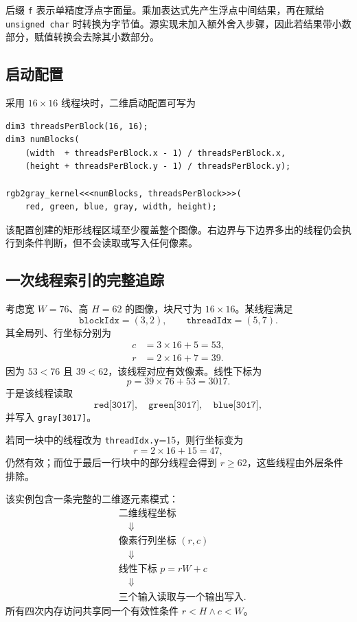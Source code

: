 后缀 \texttt{f} 表示单精度浮点字面量。乘加表达式先产生浮点中间结果，再在赋给 \texttt{unsigned char} 时转换为字节值。源实现未加入额外舍入步骤，因此若结果带小数部分，赋值转换会去除其小数部分。

\subsection{启动配置}

采用 $16\times16$ 线程块时，二维启动配置可写为
\par\noindent\begin{minipage}{\linewidth}
\begin{lstlisting}[caption={RGB 转灰度核函数的二维启动配置}]
dim3 threadsPerBlock(16, 16);
dim3 numBlocks(
    (width  + threadsPerBlock.x - 1) / threadsPerBlock.x,
    (height + threadsPerBlock.y - 1) / threadsPerBlock.y);

rgb2gray_kernel<<<numBlocks, threadsPerBlock>>>(
    red, green, blue, gray, width, height);
\end{lstlisting}
\end{minipage}\par

该配置创建的矩形线程区域至少覆盖整个图像。右边界与下边界多出的线程仍会执行到条件判断，但不会读取或写入任何像素。

\subsection{一次线程索引的完整追踪}

考虑宽 $W=76$、高 $H=62$ 的图像，块尺寸为 $16\times16$。某线程满足
\[
\texttt{blockIdx}=(3,2),
\qquad
\texttt{threadIdx}=(5,7).
\]
其全局列、行坐标分别为
\[
\begin{aligned}
c&=3\times16+5=53,\\
r&=2\times16+7=39.
\end{aligned}
\]
因为 $53<76$ 且 $39<62$，该线程对应有效像素。线性下标为
\[
p=39\times76+53=3017.
\]
于是该线程读取
\[
\texttt{red[3017]},\quad
\texttt{green[3017]},\quad
\texttt{blue[3017]},
\]
并写入 \texttt{gray[3017]}。

若同一块中的线程改为 \texttt{threadIdx.y}=15，则行坐标变为
\[
r=2\times16+15=47,
\]
仍然有效；而位于最后一行块中的部分线程会得到 $r\geq62$，这些线程由外层条件排除。

\begin{keybox}
该实例包含一条完整的二维逐元素模式：
\[
\begin{aligned}
&\text{二维线程坐标}\\
&\quad\Downarrow\\
&\text{像素行列坐标 }(r,c)\\
&\quad\Downarrow\\
&\text{线性下标 }p=rW+c\\
&\quad\Downarrow\\
&\text{三个输入读取与一个输出写入}.
\end{aligned}
\]
所有四次内存访问共享同一个有效性条件 $r<H\land c<W$。
\end{keybox}

